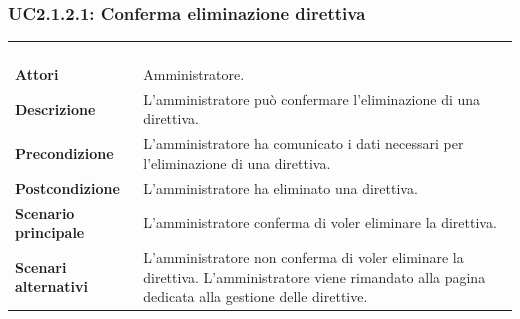 \subsubsection{UC2.1.2.1: Conferma eliminazione direttiva}
\label{UC2.1.2.1}
\begin{longtable}{l|p{10cm}}
\rowcolor[gray]{0.8} \multicolumn{2}{c}{} \\
\rowcolor[gray]{0.8} \multicolumn{2}{c}{\textbf{UC2.1.2.1 - Conferma eliminazione direttiva}} \\
\rowcolor[gray]{0.8} \multicolumn{2}{c}{} \\
\hline
&\\
\textbf{Attori} & Amministratore.\\[7pt]
\textbf{Descrizione} & L'amministratore può confermare l'eliminazione di una direttiva.\\[7pt]
\textbf{Precondizione} & L'amministratore ha comunicato i dati necessari per l'eliminazione di una direttiva.\\[7pt]
\textbf{Postcondizione} & L'amministratore ha eliminato una direttiva.\\[7pt]
\textbf{Scenario principale} &L'amministratore conferma di voler eliminare la direttiva.\\[7pt]
\textbf{Scenari alternativi} & L'amministratore non conferma di voler eliminare la direttiva. L'amministratore viene rimandato alla pagina dedicata alla gestione delle direttive.\\[7pt]\hline
\end{longtable}


